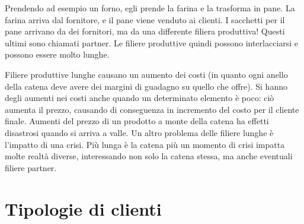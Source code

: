 Prendendo ad esempio un forno, egli prende la farina e la trasforma in pane. La
farina arriva dal fornitore, e il pane viene venduto ai clienti. I sacchetti
per il pane arrivano da dei fornitori, ma da una differente filiera produttiva!
Questi ultimi sono chiamati partner. Le filiere produttive quindi possono
interlacciarsi e possono essere molto lunghe.

Filiere produttive lunghe causano un aumento dei costi (in quanto ogni anello
della catena deve avere dei margini di guadagno su quello che offre). Si hanno
degli aumenti nei costi anche quando un determinato elemento è poco: ciò
aumenta il prezzo, causando di conseguenza in incremento del costo per il
cliente finale. Aumenti del prezzo di un prodotto a monte della catena ha
effetti disastrosi quando si arriva a valle. Un altro problema delle filiere
lunghe è l'impatto di una crisi. Più lunga è la catena più un momento di crisi
impatta molte realtà diverse, interessando non solo la catena stessa, ma anche
eventuali filiere partner.

\section{Tipologie di clienti}

